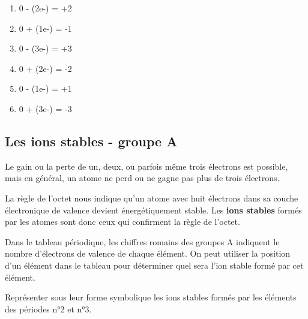 \documentclass[
  11pt,
  a4paper,
  openany]{book}
\providecommand{\tightlist}{%
  \setlength{\itemsep}{0pt}\setlength{\parskip}{0pt}}
\begin{document}
\begin{Answer}

\begin{enumerate}
\def\labelenumi{\arabic{enumi}.}
\tightlist
\item
  0 - (2e-) = +2
\item
  0 + (1e-) = -1
\item
  0 - (3e-) = +3
\item
  0 + (2e-) = -2
\item
  0 - (1e-) = +1
\item
  0 + (3e-) = -3
\end{enumerate}

\newpage

\end{Answer}

\hypertarget{les-ions-stables---groupe-a}{%
\subsection{Les ions stables - groupe A}\label{les-ions-stables---groupe-a}}

Le gain ou la perte de un, deux, ou parfois même trois électrons est possible, mais en général, un atome ne perd ou ne gagne pas plus de trois électrons.

La règle de l'octet nous indique qu'un atome avec huit électrons dans sa couche électronique de valence devient énergétiquement stable. Les \textbf{ions stables} formés par les atomes sont donc ceux qui confirment la règle de l'octet.

Dans le tableau périodique, les chiffres romains des groupes A indiquent le nombre d'électrons de valence de chaque élément. On peut utiliser la position d'un élément dans le tableau pour déterminer quel sera l'ion stable formé par cet élément.

\begin{Exercise}
Représenter sous leur forme symbolique les ions stables formés par les éléments des périodes n°2 et n°3.

\end{Exercise}
\end{document}
